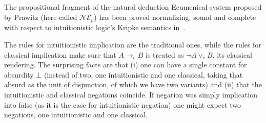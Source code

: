 The propositional fragment of the natural deduction Ecumenical system proposed by Prawitz (here called $\mathcal{NE}_{p}$) has been proved normalizing, sound and complete with respect to  intuitionistic logic's Kripke semantics in~\cite{luiz17}. 

The rules for intuitionistic implication are the traditional ones, while the rules for classical implication make sure that $A\to_{c} B$ is treated as $\neg A\lor_c B$, its classical rendering. The surprising facts are that (i) one can have a single constant for absurdity $\bot$ (instead of two, one intuitionistic and one classical, taking that absurd as the unit of disjunction, of which we have two variants) and (ii) that the intuitionistic and classical negations coincide.
If negation was simply implication into false (as it is the case for intuitionistic negation) one might expect two negations, one intuitionistic and one classical.